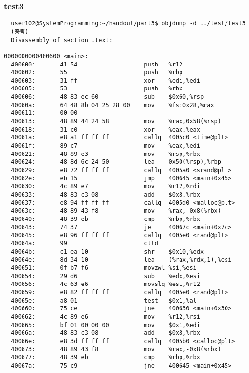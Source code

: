\documentclass{report}
\begin{document}
\subsubsection{test3}
\begin{verbatim}
  user102@SystemProgramming:~/handout/part3$ objdump -d ../test/test3
  (중략)
  Disassembly of section .text:

0000000000400600 <main>:
  400600:       41 54                   push   %r12
  400602:       55                      push   %rbp
  400603:       31 ff                   xor    %edi,%edi
  400605:       53                      push   %rbx
  400606:       48 83 ec 60             sub    $0x60,%rsp
  40060a:       64 48 8b 04 25 28 00    mov    %fs:0x28,%rax
  400611:       00 00
  400613:       48 89 44 24 58          mov    %rax,0x58(%rsp)
  400618:       31 c0                   xor    %eax,%eax
  40061a:       e8 a1 ff ff ff          callq  4005c0 <time@plt>
  40061f:       89 c7                   mov    %eax,%edi
  400621:       48 89 e3                mov    %rsp,%rbx
  400624:       48 8d 6c 24 50          lea    0x50(%rsp),%rbp
  400629:       e8 72 ff ff ff          callq  4005a0 <srand@plt>
  40062e:       eb 15                   jmp    400645 <main+0x45>
  400630:       4c 89 e7                mov    %r12,%rdi
  400633:       48 83 c3 08             add    $0x8,%rbx
  400637:       e8 94 ff ff ff          callq  4005d0 <malloc@plt>
  40063c:       48 89 43 f8             mov    %rax,-0x8(%rbx)
  400640:       48 39 eb                cmp    %rbp,%rbx
  400643:       74 37                   je     40067c <main+0x7c>
  400645:       e8 96 ff ff ff          callq  4005e0 <rand@plt>
  40064a:       99                      cltd
  40064b:       c1 ea 10                shr    $0x10,%edx
  40064e:       8d 34 10                lea    (%rax,%rdx,1),%esi
  400651:       0f b7 f6                movzwl %si,%esi
  400654:       29 d6                   sub    %edx,%esi
  400656:       4c 63 e6                movslq %esi,%r12
  400659:       e8 82 ff ff ff          callq  4005e0 <rand@plt>
  40065e:       a8 01                   test   $0x1,%al
  400660:       75 ce                   jne    400630 <main+0x30>
  400662:       4c 89 e6                mov    %r12,%rsi
  400665:       bf 01 00 00 00          mov    $0x1,%edi
  40066a:       48 83 c3 08             add    $0x8,%rbx
  40066e:       e8 3d ff ff ff          callq  4005b0 <calloc@plt>
  400673:       48 89 43 f8             mov    %rax,-0x8(%rbx)
  400677:       48 39 eb                cmp    %rbp,%rbx
  40067a:       75 c9                   jne    400645 <main+0x45>

\end{verbatim}
\end{document}
